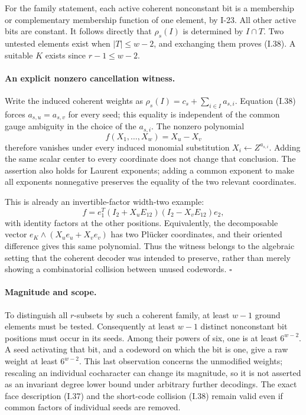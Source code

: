 \documentclass[11pt,a4paper]{article}
\theoremstyle{definition}\newtheorem{definition}{Definition}
\begin{document}
For the family statement, each active coherent nonconstant
bit is a membership or complementary membership function of
one element, by I-23.  All other active bits are constant.
It follows directly that $\rho_s(I)$ is determined by
$I\cap T$.  Two untested elements exist when $|T|\le w-2$,
and exchanging them proves (I.38).  A suitable $K$ exists
since $r-1\le w-2$.

\paragraph{An explicit nonzero cancellation witness.}
Write the induced coherent weights as
$\rho_s(I)=c_s+\sum_{i\in I}a_{s,i}$.
Equation (I.38) forces $a_{s,u}=a_{s,v}$ for every seed;
this equality is independent of the common gauge ambiguity
in the choice of the $a_{s,i}$.  The nonzero polynomial
\[
 f(X_1,\ldots,X_w)=X_u-X_v
\]
therefore vanishes under every induced monomial substitution
$X_i\leftarrow Z^{a_{s,i}}$.  Adding the same scalar center
to every coordinate does not change that conclusion.
The assertion also holds for Laurent exponents; adding a
common exponent to make all exponents nonnegative preserves
the equality of the two relevant coordinates.

This is already an invertible-factor width-two example:
\[
 f=e_1^T(I_2+X_uE_{12})(I_2-X_vE_{12})e_2,
\]
with identity factors at the other positions.  Equivalently,
the decomposable vector
$e_K\wedge(X_u e_u+X_v e_v)$ has two Pl\"ucker coordinates,
and their oriented difference gives this same polynomial.
Thus the witness belongs to the algebraic setting that the
coherent decoder was intended to preserve, rather than merely
showing a combinatorial collision between unused codewords.
\hfill$\square$

\paragraph{Magnitude and scope.}
To distinguish all $r$-subsets by such a coherent family,
at least $w-1$ ground elements must be tested.  Consequently
at least $w-1$ distinct nonconstant bit positions must occur
in its seeds.  Among their powers of six, one is at least
$6^{w-2}$.  A seed activating that bit, and a codeword on
which the bit is one, give a raw weight at least $6^{w-2}$.
This last observation concerns the unmodified weights;
rescaling an individual cocharacter can change its magnitude,
so it is not asserted as an invariant degree lower bound
under arbitrary further decodings.  The exact face
description (I.37) and the short-code collision (I.38) remain
valid even if common factors of individual seeds are removed.
\end{document}
